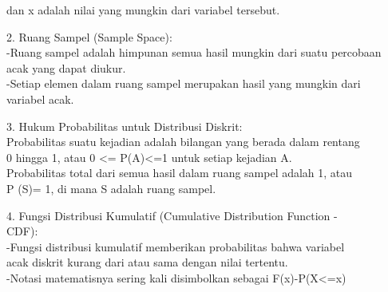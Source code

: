 \documentclass[a4paper,10pt]{article}
\begin{document}
\begin{eulernotebook}
\begin{eulercomment}
\begin{eulercomment}
\begin{eulercomment}
\begin{eulercomment}
\begin{eulercomment}
\begin{eulercomment}
\begin{eulercomment}
\begin{eulercomment}
\begin{eulercomment}
\begin{eulercomment}
\begin{eulercomment}
dan x adalah nilai yang mungkin dari variabel tersebut.\\
\end{eulercomment}
\begin{eulerttcomment}
 
\end{eulerttcomment}
\begin{eulercomment}
2. Ruang Sampel (Sample Space):\\
-Ruang sampel adalah himpunan semua hasil mungkin dari suatu percobaan\\
acak yang dapat diukur.\\
-Setiap elemen dalam ruang sampel merupakan hasil yang mungkin dari\\
variabel acak.\\
\end{eulercomment}
\begin{eulerttcomment}
 
\end{eulerttcomment}
\begin{eulercomment}
3. Hukum Probabilitas untuk Distribusi Diskrit:\\
Probabilitas suatu kejadian adalah bilangan yang berada dalam rentang\\
0 hingga 1, atau 0 \textless{}= P(A)\textless{}=1 untuk setiap kejadian A.\\
Probabilitas total dari semua hasil dalam ruang sampel adalah 1, atau\\
P (S)= 1, di mana S adalah ruang sampel.\\
\end{eulercomment}
\begin{eulerttcomment}
 
\end{eulerttcomment}
\begin{eulercomment}
4. Fungsi Distribusi Kumulatif (Cumulative Distribution Function -\\
CDF):\\
-Fungsi distribusi kumulatif memberikan probabilitas bahwa variabel\\
acak diskrit kurang dari atau sama dengan nilai tertentu.\\
-Notasi matematisnya sering kali disimbolkan sebagai F(x)-P(X\textless{}=x)\\
\end{eulercomment}
\begin{eulerttcomment}
 

\end{eulerttcomment}
\end{eulercomment}
\end{eulercomment}
\end{eulercomment}
\end{eulercomment}
\end{eulercomment}
\end{eulercomment}
\end{eulercomment}
\end{eulercomment}
\end{eulercomment}
\end{eulercomment}
\end{eulernotebook}
\end{document}
